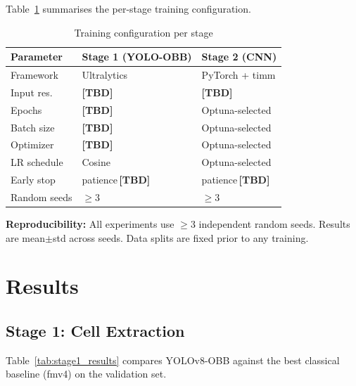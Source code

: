 \documentclass[conference]{IEEEtran}
\begin{document}
Table~\ref{tab:training_config} summarises the per-stage
training configuration.

\begin{table}[t]
  \caption{Training configuration per stage}
  \label{tab:training_config}
  \begin{center}
  \renewcommand{\arraystretch}{1.05}
  \small
  \begin{tabular}{lll}
    \toprule
    \textbf{Parameter} &
    \textbf{Stage 1 (YOLO-OBB)} &
    \textbf{Stage 2 (CNN)} \\
    \midrule
    Framework    & Ultralytics     & PyTorch + timm \\
    Input res.   & \textbf{[TBD]}  & \textbf{[TBD]} \\
    Epochs       & \textbf{[TBD]}  & Optuna-selected \\
    Batch size   & \textbf{[TBD]}  & Optuna-selected \\
    Optimizer    & \textbf{[TBD]}  & Optuna-selected \\
    LR schedule  & Cosine          & Optuna-selected \\
    Early stop   & patience\,\textbf{[TBD]} & patience\,\textbf{[TBD]} \\
    Random seeds & $\geq 3$        & $\geq 3$ \\
    \bottomrule
  \end{tabular}
  \end{center}
\end{table}

\textbf{Reproducibility:} All experiments use $\geq$3 independent
random seeds. Results are mean$\pm$std across seeds.
Data splits are fixed prior to any training.

\section{Results}

\subsection{Stage 1: Cell Extraction}

Table~\ref{tab:stage1_results} compares YOLOv8-OBB against the
best classical baseline (fmv4) on the validation set.
\end{document}
